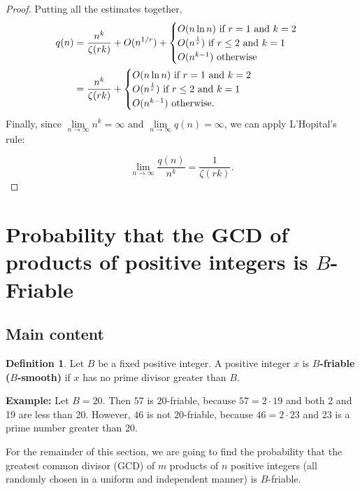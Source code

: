 \documentclass[10pt,a4paper]{article}
\theoremstyle{definition}
\newtheorem{definition}{Definition}[section]
\theoremstyle{remark}
\begin{document}
\begin{proof}
	Putting all the estimates together, 
	\begin{align}
		q(n) &= \frac{n^k}{\zeta(rk)}+O(n^{{1}/r})+ \begin{cases}
			O(n\ln n) \text{ if } r=1 \text{ and } k=2\\
			O(n^{\frac{1}{r}}) \text{ if } r\leq 2 \text{ and } k=1\\
			O(n^{k-1}) \text{ otherwise}\end{cases}\notag\\
		&= \frac{n^k}{\zeta(rk)}+ \begin{cases}
			O(n\ln n) \text{ if } r=1 \text{ and } k=2\\
			O(n^{\frac{1}{r}}) \text{ if } r\leq 2 \text{ and } k=1\\
			O(n^{k-1}) \text{ otherwise.}\end{cases}
	\end{align}
	Finally, since \(\lim\limits_{n\to\infty} n^k = \infty\) and \(\lim\limits_{n\to\infty} q(n)=\infty\), we can apply L'Hopital's rule:
	
	\begin{equation}
		\lim\limits_{n\to\infty} \frac{q(n)}{n^k} = \frac{1}{\zeta(rk)}.
	\end{equation}
\end{proof}

\section{Probability that the GCD of products of positive integers is  \texorpdfstring{\(B\)}{}-Friable}

\subsection{Main content}

\begin{definition} Let $B$ be a fixed positive integer. A positive integer $x$ is \textbf{$B$-friable ($B$-smooth)} if $x$ has no prime divisor greater than $B$. 
\end{definition}

\noindent \textbf{Example:} Let $B = 20$. Then $57$ is $20$-friable, because $57 = 2 \cdot 19$ and both 2 and 19 are less than 20. However, $46$ is not $20$-friable, because $46= 2 \cdot 23$ and 23 is a prime number greater than 20.

\vspace{.1 in}

For the remainder of this section, we are going to find the probability that the greatest common divisor (GCD) of $m$ products of $n$ positive integers (all randomly chosen in a uniform and independent manner) is $B$-friable.
\end{document}
